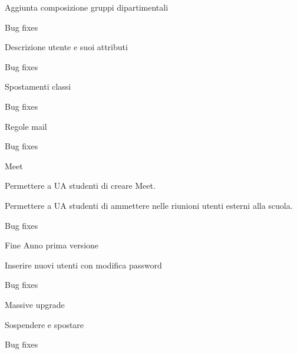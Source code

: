 \begin{changelog}[author=JOHN DOE, sectioncmd=\chapter*]
\begin{version}[v=1.9.9,
		date=2023-08-25]
	\end{version}
	\begin{version}[v=1.0.6,
		date=2023-08-14]
		\added
		\item Aggiunta composizione gruppi dipartimentali
		\fixed
		\item Bug fixes
	\end{version}
	\begin{version}[v=1.0.5,
		date=2023-08-11]
		\added
		\item Descrizione utente e suoi attributi
		\fixed
		\item Bug fixes
	\end{version}
	\begin{version}[v=1.0.4,
		date=2023-07-25]
		\added
		\item Spostamenti classi
		\fixed
		\item Bug fixes
	\end{version}
	\begin{version}[v=1.0.3,
		date=2023-07-25]
		\added
		\item Regole mail
		\fixed
		\item Bug fixes
	\end{version}
		\begin{version}[v=1.0.2,
		date=2023-07-21]
		\added
		\item Meet
		\item Permettere a  UA studenti di creare Meet.
		\item Permettere a UA studenti di ammettere nelle riunioni utenti esterni alla scuola.
		\fixed
		\item Bug fixes
	\end{version}
	\begin{version}[v=1.0.1,
		date=2023-07-17]
		\added
		\item Fine Anno prima versione
		\item Inserire nuovi utenti con modifica password
		\fixed
		\item Bug fixes
	\end{version}
	\begin{version}[v=1.0.0,
		date=2023-07-15]
		\added
		\item Massive upgrade
		\item Sospendere e spostare
		\fixed
		\item Bug fixes
	\end{version}
	\end{changelog}
	\listoftodos